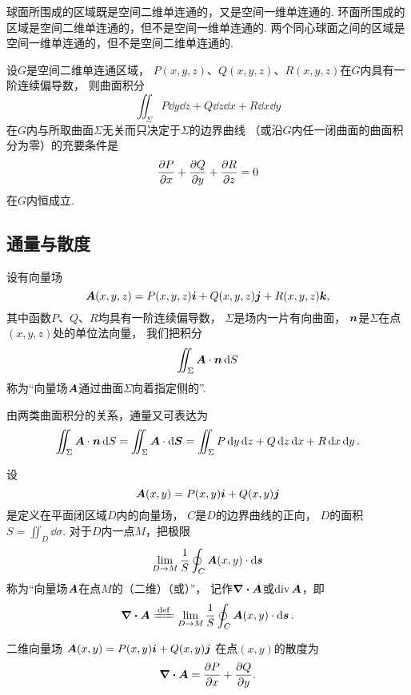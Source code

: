 \begin{example}
球面所围成的区域既是空间二维单连通的，又是空间一维单连通的.
环面所围成的区域是空间二维单连通的，但不是空间一维单连通的.
两个同心球面之间的区域是空间一维单连通的，但不是空间二维单连通的.
\end{example}

\begin{theorem}\label{theorem:线积分与面积分.沿任意闭曲面的曲面积分为零的条件}
设\(G\)是空间二维单连通区域，
\(P(x,y,z)\)、\(Q(x,y,z)\)、\(R(x,y,z)\)在\(G\)内具有一阶连续偏导数，
则曲面积分\[
	\iint_\Sigma P\dd{y}\dd{z}+Q\dd{z}\dd{x}+R\dd{x}\dd{y}
\]
在\(G\)内与所取曲面\(\Sigma\)无关而只决定于\(\Sigma\)的边界曲线
（或沿\(G\)内任一闭曲面的曲面积分为零）的充要条件是\[
	\pdv{P}{x}+\pdv{Q}{y}+\pdv{R}{z} = 0
\]在\(G\)内恒成立.
\end{theorem}

\subsection{通量与散度}
\begin{definition}
设有向量场\[
	\boldsymbol{A}(x,y,z)=P(x,y,z)\boldsymbol{i}+Q(x,y,z)\boldsymbol{j}+R(x,y,z)\boldsymbol{k},
\]
其中函数\(P\)、\(Q\)、\(R\)均具有一阶连续偏导数，
\(\Sigma\)是场内一片有向曲面，
\(\boldsymbol{n}\)是\(\Sigma\)在点\((x,y,z)\)处的单位法向量，
我们把积分\[
	\iint_\Sigma{\boldsymbol{A}\cdot\boldsymbol{n}\dd{S}}
\]称为“向量场\(\boldsymbol{A}\)通过曲面\(\Sigma\)向着指定侧的”.
\end{definition}
由两类曲面积分的关系，通量又可表达为\[
	\iint_\Sigma \boldsymbol{A}\cdot\boldsymbol{n}\dd{S}
	=\iint_\Sigma \boldsymbol{A}\cdot\dd{\boldsymbol{S}}
	=\iint_\Sigma P\dd{y}\dd{z}+Q\dd{z}\dd{x}+R\dd{x}\dd{y}.
\]

\begin{definition}[平面上的散度]
\def\defofdiv{\lim_{D \to M} \frac{1}{S} \oint_C \vb{A}(x,y) \cdot \dd{\vb{s}}}%
设\[
	\boldsymbol{A}(x,y)=P(x,y)\boldsymbol{i}+Q(x,y)\boldsymbol{j}
\]是定义在平面闭区域\(D\)内的向量场，
\(C\)是\(D\)的边界曲线的正向，
\(D\)的面积\(S = \iint_{D} \dd{\sigma}\).
对于\(D\)内一点\(M\)，把极限\[
	\defofdiv
\]称为“向量场\(\boldsymbol{A}\)在点\(M\)的（二维）（或）”，
记作\(\div{\boldsymbol{A}}\)或\(\operatorname{div}\boldsymbol{A}\)，即\[
	\div{\vb{A}} \defeq \defofdiv.
\]
\end{definition}

\begin{proposition}
二维向量场
\(\boldsymbol{A}(x,y)=P(x,y)\boldsymbol{i}+Q(x,y)\boldsymbol{j}\)
在点\((x,y)\)的散度为\[
	\div{\boldsymbol{A}} = \pdv{P}{x}+\pdv{Q}{y}.
\]
\end{proposition}

